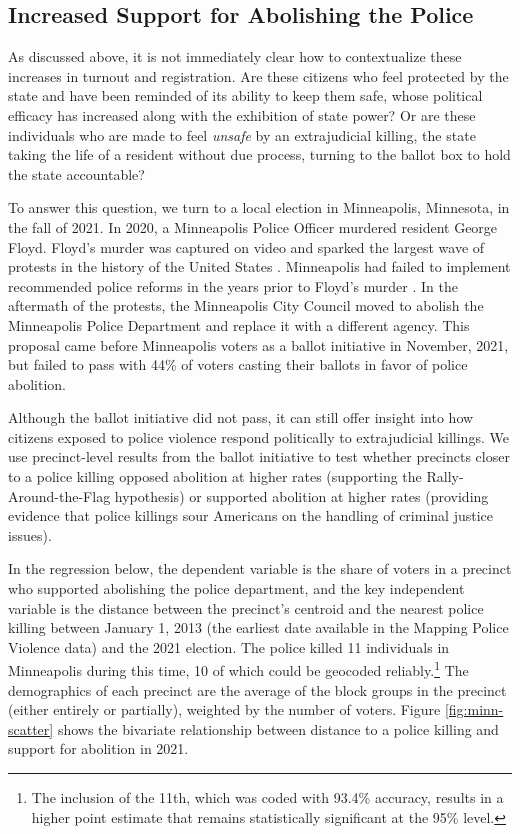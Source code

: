 \documentclass[12pt]{article}
\begin{document}
\subsection*{Increased Support for Abolishing the Police}

As discussed above, it is not immediately clear how to contextualize these increases in turnout and registration. Are these citizens who feel protected by the state and have been reminded of its ability to keep them safe, whose political efficacy has increased along with the exhibition of state power? Or are these individuals who are made to feel \textit{unsafe} by an extrajudicial killing, the state taking the life of a resident without due process, turning to the ballot box to hold the state accountable?

To answer this question, we turn to a local election in Minneapolis, Minnesota, in the fall of 2021. In 2020, a Minneapolis Police Officer murdered resident George Floyd. Floyd's murder was captured on video and sparked the largest wave of protests in the history of the United States \citep{Buchanan2020}. Minneapolis had failed to implement recommended police reforms in the years prior to Floyd's murder \citep{Lartey2020}. In the aftermath of the protests, the Minneapolis City Council moved to abolish the Minneapolis Police Department and replace it with a different agency. This proposal came before Minneapolis voters as a ballot initiative in November, 2021, but failed to pass with 44\% of voters casting their ballots in favor of police abolition.

Although the ballot initiative did not pass, it can still offer insight into how citizens exposed to police violence respond politically to extrajudicial killings. We use precinct-level results from the ballot initiative to test whether precincts closer to a police killing opposed abolition at higher rates (supporting the Rally-Around-the-Flag hypothesis) or supported abolition at higher rates (providing evidence that police killings sour Americans on the handling of criminal justice issues).

In the regression below, the dependent variable is the share of voters in a precinct who supported abolishing the police department, and the key independent variable is the distance between the precinct's centroid and the nearest police killing between January 1, 2013 (the earliest date available in the Mapping Police Violence data) and the 2021 election. The police killed 11 individuals in Minneapolis during this time, 10 of which could be geocoded reliably.\footnote{The inclusion of the 11th, which was coded with 93.4\% accuracy, results in a higher point estimate that remains statistically significant at the 95\% level.} The demographics of each precinct are the average of the block groups in the precinct (either entirely or partially), weighted by the number of voters. Figure \ref{fig:minn-scatter} shows the bivariate relationship between distance to a police killing and support for abolition in 2021.
\end{document}
